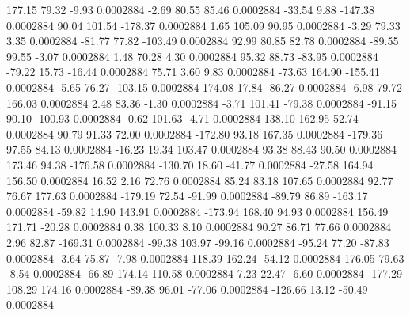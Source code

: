       177.15       79.32       -9.93     0.0002884
       -2.69       80.55       85.46     0.0002884
      -33.54        9.88     -147.38     0.0002884
       90.04      101.54     -178.37     0.0002884
        1.65      105.09       90.95     0.0002884
       -3.29       79.33        3.35     0.0002884
      -81.77       77.82     -103.49     0.0002884
       92.99       80.85       82.78     0.0002884
      -89.55       99.55       -3.07     0.0002884
        1.48       70.28        4.30     0.0002884
       95.32       88.73      -83.95     0.0002884
      -79.22       15.73      -16.44     0.0002884
       75.71        3.60        9.83     0.0002884
      -73.63      164.90     -155.41     0.0002884
       -5.65       76.27     -103.15     0.0002884
      174.08       17.84      -86.27     0.0002884
       -6.98       79.72      166.03     0.0002884
        2.48       83.36       -1.30     0.0002884
       -3.71      101.41      -79.38     0.0002884
      -91.15       90.10     -100.93     0.0002884
       -0.62      101.63       -4.71     0.0002884
      138.10      162.95       52.74     0.0002884
       90.79       91.33       72.00     0.0002884
     -172.80       93.18      167.35     0.0002884
     -179.36       97.55       84.13     0.0002884
      -16.23       19.34      103.47     0.0002884
       93.38       88.43       90.50     0.0002884
      173.46       94.38     -176.58     0.0002884
     -130.70       18.60      -41.77     0.0002884
      -27.58      164.94      156.50     0.0002884
       16.52        2.16       72.76     0.0002884
       85.24       83.18      107.65     0.0002884
       92.77       76.67      177.63     0.0002884
     -179.19       72.54      -91.99     0.0002884
      -89.79       86.89     -163.17     0.0002884
      -59.82       14.90      143.91     0.0002884
     -173.94      168.40       94.93     0.0002884
      156.49      171.71      -20.28     0.0002884
        0.38      100.33        8.10     0.0002884
       90.27       86.71       77.66     0.0002884
        2.96       82.87     -169.31     0.0002884
      -99.38      103.97      -99.16     0.0002884
      -95.24       77.20      -87.83     0.0002884
       -3.64       75.87       -7.98     0.0002884
      118.39      162.24      -54.12     0.0002884
      176.05       79.63       -8.54     0.0002884
      -66.89      174.14      110.58     0.0002884
        7.23       22.47       -6.60     0.0002884
     -177.29      108.29      174.16     0.0002884
      -89.38       96.01      -77.06     0.0002884
     -126.66       13.12      -50.49     0.0002884
